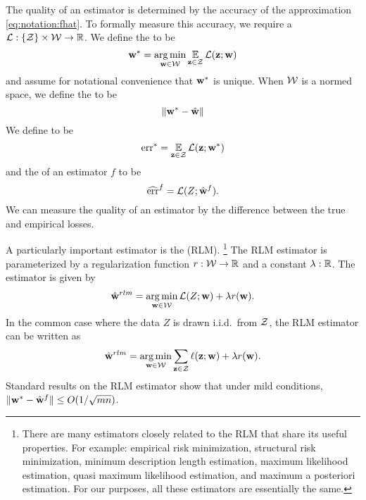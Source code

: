 \documentclass[thesis.tex]{subfiles}
\newcommand{\riskstar}{{\textrm{err}^*}}
\newcommand{\riskhat}{\widehat{\textrm{err}}}
\begin{document}
The quality of an estimator is determined by the accuracy of the approximation \eqref{eq:notation:fhat}.
To formally measure this accuracy, 
we require a  $\mathcal{L} : \{{\mathcal Z}\} \times {\mathcal W} \to \mathbb R$. 
We define the  to be 
\begin{equation}
    {\mathbf w^{*}} = \operatorname*{arg\,min}_{\mathbf w\in{\mathcal W}} \operatorname*{\mathbb E}_{\mathbf z\in{\mathcal Z}}\mathcal{L}(\mathbf z;\mathbf w)
\end{equation}
and assume for notational convenience that ${\mathbf w^{*}}$ is unique.
When ${\mathcal W}$ is a normed space, we define the  to be
\begin{equation}
    {\lVert {{\mathbf w^{*}}-{\hat{\mathbf w}}} \rVert}
\end{equation}
We define  to be
\begin{equation}
    \riskstar = \E_{\z\in\Z}\Loss(\z;\wstar)
\end{equation}
and the  of an estimator $f$ to be 
\begin{equation}
    \riskhat^f = \Loss(Z;\what^f)
    .
\end{equation}
We can measure the quality of an estimator by the difference between the true and empirical losses.

A particularly important estimator is the  (RLM).%
\footnote{
    There are many estimators closely related to the RLM that share its useful properties.
    For example: 
    empirical risk minimization,
    structural risk minimization,
    minimum description length estimation,
    maximum likelihood estimation, 
    quasi maximum likelihood estimation,
    and maximum a posteriori estimation.
    For our purposes, all these estimators are essentially the same.
}
The RLM estimator is parameterized by a regularization function $r : {\mathcal W} \to \mathbb R$ 
and a constant $\lambda : \mathbb R$.
The estimator is given by
\begin{equation}
    \hat{\mathbf w}^{rlm} = \operatorname*{arg\,min}_{\mathbf w\in{\mathcal W}} \mathcal{L}(Z;\mathbf w) + \lambda r(\mathbf w)
    .
\end{equation}
In the common case where the data $Z$ is drawn i.i.d.\ from ${\mathcal Z}$, the RLM estimator can be written as
\begin{equation}
    \hat{\mathbf w}^{rlm} = \operatorname*{arg\,min}_{\mathbf w\in{\mathcal W}} \sum_{\mathbf z\in{\mathcal Z}}\ell(\mathbf z;\mathbf w) + \lambda r(\mathbf w)
    .
\end{equation}
Standard results on the RLM estimator show that under mild conditions,
${\lVert {{\mathbf w^{*}}-{\hat{\mathbf w}}^f} \rVert}\le O(1/\sqrt{mn})$.
\end{document}

